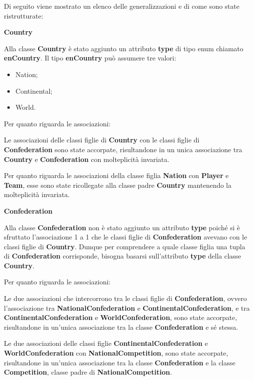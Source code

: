 Di seguito viene mostrato un elenco delle generalizzazioni e 
di come sono state ristrutturate:

\bigskip
\textbf{Country}
\bigskip

Alla classe \textbf{Country} è stato aggiunto un attributo 
\textbf{type} di tipo enum chiamato \textbf{enCountry}.
Il tipo \textbf{enCountry} può assumere tre valori:
\begin{itemize}
	\item Nation;
	\item Continental;
	\item World.
\end{itemize}

Per quanto riguarda le associazioni:

Le associazioni delle classi figlie di \textbf{Country} con 
le classi figlie di \textbf{Confederation} sono state 
accorpate, risultandone in un unica associazione tra 
\textbf{Country} e \textbf{Confederation} con molteplicità 
invariata.

Per quanto riguarda le associazioni della classe figlia 
\textbf{Nation} con \textbf{Player} e \textbf{Team}, esse 
sono state ricollegate alla classe padre \textbf{Country} 
mantenendo la molteplicità invariata.

\bigskip
\textbf{Confederation}
\bigskip

Alla classe \textbf{Confederation}  non è stato aggiunto un 
attributo \textbf{type} poiché si è sfruttato l'associazione 
1 a 1 che le classi figlie di \textbf{Confederation} avevano 
con le classi figlie di \textbf{Country}.
Dunque per comprendere a quale classe figlia una tupla di 
\textbf{Confederation} corrisponde, bisogna basarsi 
sull'attributo \textbf{type} della classe \textbf{Country}.

Per quanto riguarda le associazioni:

Le due associazioni che intercorrono tra le classi figlie di 
\textbf{Confederation}, ovvero l'associazione tra 
\textbf{NationalConfederation} e 
\textbf{ContinentalConfederation}, e tra 
\textbf{ContinentalConfederation} e 
\textbf{WorldConfederation}, sono state accorpate, 
risultandone in un'unica associazione tra la classe 
\textbf{Confederation} e sé stessa.

Le due associazioni delle classi figlie 
\textbf{ContinentalConfederation} e 
\textbf{WorldConfederation} con \textbf{NationalCompetition}, 
sono state accorpate, risultandone in un'unica associazione 
tra la classe \textbf{Confederation} e la classe 
\textbf{Competition}, classe padre di 
\textbf{NationalCompetition}.

